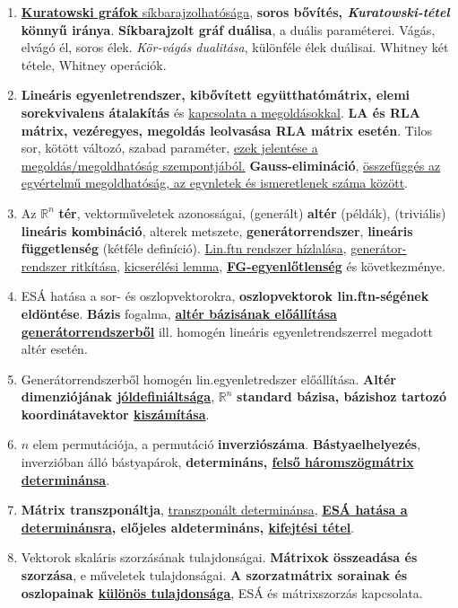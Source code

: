\documentclass[10pt]{article}
\begin{document}
\begin{enumerate}
            \sloppy\item \underline{\textbf{Kuratowski gráfok} síkbarajzolhatósága}, \textbf{soros bővítés, \textit{Kuratowski-tétel} könnyű iránya}. \textbf{Síkbarajzolt gráf duálisa}, a duális paraméterei. Vágás, elvágó él, soros élek. \textit{Kör-vágás dualitása}, különféle élek duálisai. Whitney két tétele, Whitney operációk.
            \item \textbf{Lineáris egyenletrendszer, kibővített együtthatómátrix, elemi sorekvivalens átalakítás} és \underline{kapcsolata a megoldásokkal}. \textbf{LA és RLA mátrix, vezéregyes, megoldás leolvasása RLA mátrix esetén}. Tilos sor, kötött változó, szabad paraméter, \underline{ezek jelentése a megoldás/megoldhatóság szempontjából.} \textbf{Gauss-elimináció}, \underline{összefüggés az egyértelmű megoldhatóság, az egynletek és ismeretlenek száma között}.
            \item Az $\mathbb{R}^n$ \textbf{tér}, vektorműveletek azonosságai, (generált) \textbf{altér} (példák), (triviális) \textbf{lineáris kombináció}, alterek metszete, \textbf{generátorrendszer}, \textbf{lineáris függetlenség} (kétféle definíció). \underline{Lin.ftn rendszer hízlalása}, \underline{generátor-rendszer ritkítása}, \underline{kicserélési lemma}, \underline{\textbf{FG-egyenlőtlenség}} és következménye.
            \item ESÁ hatása a sor- és oszlopvektorokra, \textbf{oszlopvektorok lin.ftn-ségének eldöntése}. \textbf{Bázis} fogalma, \underline{\textbf{altér bázisának előállítása generátorrendszerből}} ill. homogén lineáris egyenletrendszerrel megadott altér esetén.
            \item Generátorrendszerből homogén lin.egyenletredszer előállítása. \textbf{Altér dimenziójának \underline{jóldefiniáltsága}}, $\mathbb{R}^n$ \textbf{standard bázisa, bázishoz tartozó koordinátavektor \underline{kiszámítása}}.
            \item $n$ elem permutációja, a permutáció \textbf{inverziószáma}. \textbf{Bástyaelhelyezés}, inverzióban álló bástyapárok, \textbf{determináns, \underline{felső háromszögmátrix determinánsa}}.
            \item \textbf{Mátrix transzponáltja}, \underline{transzponált determinánsa}, \textbf{\underline{ESÁ hatása a determinánsra}, előjeles aldetermináns, \underline{kifejtési tétel}}.
            \item Vektorok skaláris szorzásának tulajdonságai. \textbf{Mátrixok összeadása és szorzása}, e műveletek tulajdonságai. \textbf{A szorzatmátrix sorainak és oszlopainak \underline{különös tulajdonsága}}, ESÁ és mátrixszorzás kapcsolata.

\end{enumerate}
\end{document}
